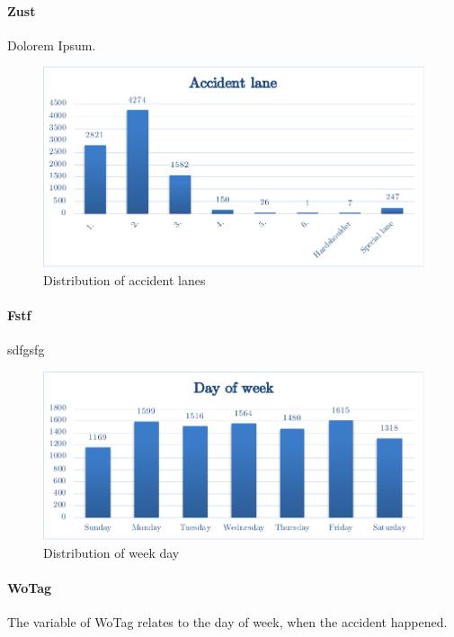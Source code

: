 \documentclass[a4paper,12pt]{report}
\begin{document}
\paragraph{Zust}
Dolorem Ipsum. 

\begin{figure}[H]
	\centering
	\includegraphics[scale=0.6]{./assets/baysis_dataset_Fstf.pdf}
	\caption{Distribution of accident lanes}
	\label{img:baysis_dataset_Fstf}
\end{figure}

\paragraph{Fstf}
sdfgsfg

\begin{figure}[H]
	\centering
	\includegraphics[scale=0.6]{./assets/baysis_dataset_WoTag.pdf}
	\caption{Distribution of week day}
	\label{img:baysis_dataset_Fstf}
\end{figure}

\paragraph{WoTag}
The variable of WoTag relates to the day of week, when the accident happened. 
\end{document}
